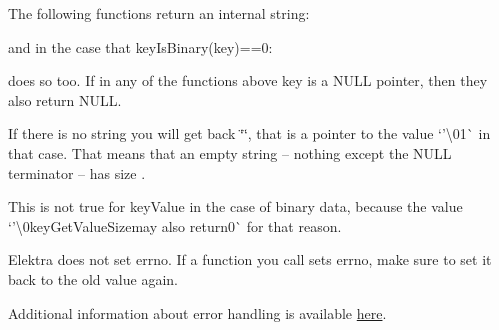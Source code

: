 The following functions return an internal string\+:


\begin{DoxyCode}{0}
\end{DoxyCode}


and in the case that {\ttfamily key\+Is\+Binary(key)==0}\+:


\begin{DoxyCode}{0}
\end{DoxyCode}


does so too. If in any of the functions above {\ttfamily key} is a {\ttfamily N\+U\+LL} pointer, then they also return {\ttfamily N\+U\+LL}.

If there is no string you will get back {\ttfamily \char`\"{}\char`\"{}}, that is a pointer to the value `'\textbackslash{}01\`{} in that case. That means that an empty string – nothing except the N\+U\+LL terminator – has size {}.

This is not true for {\ttfamily key\+Value} in the case of binary data, because the value `'\textbackslash{}0key\+Get\+Value\+Size{\ttfamily may also return}0\`{} for that reason.

Elektra does not set {\ttfamily errno}. If a function you call sets {\ttfamily errno}, make sure to set it back to the old value again.

Additional information about error handling is available \mbox{\hyperlink{doc_dev_error-handling_md}{here}}.

